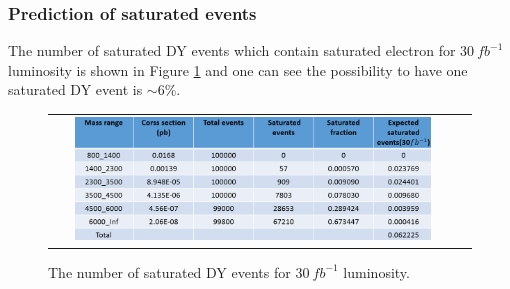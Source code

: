 \subsubsection{Prediction of saturated events}

The number of saturated DY events which contain saturated electron for $30~fb^{-1}$ luminosity is shown in Figure \ref{fig:Prediction_DY_s} and one can see the possibility to have one saturated DY event is $\sim 6\%$.

\begin{figure}[bh]
  \begin{center}
    \begin{tabular}{cc}
      \includegraphics[width=0.9\textwidth]{chapters/Zprime/Saturation/images/FlatPt/Result/prediction.png} &
    \end{tabular}
    \caption{ The number of saturated DY events for $30~fb^{-1}$ luminosity.}
    \label{fig:Prediction_DY_s}
  \end{center}
\end{figure}
